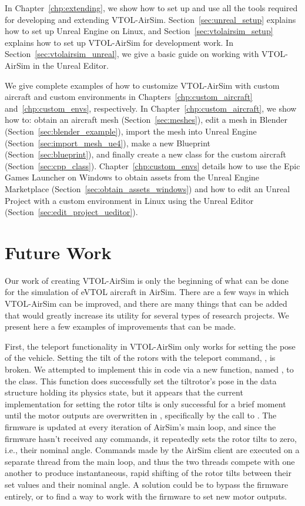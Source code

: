 In Chapter~\ref{chp:extending}, we show how to set up and use all the tools required for developing and extending VTOL-AirSim. Section~\ref{sec:unreal_setup} explains how to set up Unreal Engine on Linux, and Section~\ref{sec:vtolairsim_setup} explains how to set up VTOL-AirSim for development work. In Section~\ref{sec:vtolairsim_unreal}, we give a basic guide on working with VTOL-AirSim in the Unreal Editor.

We give complete examples of how to customize VTOL-AirSim with custom aircraft and custom environments in Chapters~\ref{chp:custom_aircraft} and~\ref{chp:custom_envs}, respectively. In Chapter~\ref{chp:custom_aircraft}, we show how to: obtain an aircraft mesh (Section~\ref{sec:meshes}), edit a mesh in Blender (Section~\ref{sec:blender_example}), import the mesh into Unreal Engine (Section~\ref{sec:import_mesh_ue4}), make a new Blueprint (Section~\ref{sec:blueprint}), and finally create a new \CC class for the custom aircraft (Section~\ref{sec:cpp_class}). Chapter~\ref{chp:custom_envs} details how to use the Epic Games Launcher on Windows to obtain assets from the Unreal Engine Marketplace (Section~\ref{sec:obtain_assets_windows}) and how to edit an Unreal Project with a custom environment in Linux using the Unreal Editor (Section~\ref{sec:edit_project_ueditor}).


\section{Future Work}
Our work of creating VTOL-AirSim is only the beginning of what can be done for the simulation of eVTOL aircraft in AirSim. There are a few ways in which VTOL-AirSim can be improved, and there are many things that can be added that would greatly increase its utility for several types of research projects. We present here a few examples of improvements that can be made.

First, the teleport functionality in VTOL-AirSim only works for setting the pose of the vehicle. Setting the tilt of the rotors with the teleport command, , is broken. We attempted to implement this in code via a new function, named , to the  \CC class. This function does successfully set the tiltrotor's pose in the data structure holding its physics state, but it appears that the current implementation for setting the rotor tilts is only successful for a brief moment until the motor outputs are overwritten in , specifically by the call to . The firmware is updated at every iteration of AirSim's main loop, and since the firmware hasn't received any commands, it repeatedly sets the rotor tilts to zero, i.e., their nominal angle. Commands made by the AirSim client are executed on a separate thread from the main loop, and thus the two threads compete with one another to produce instantaneous, rapid shifting of the rotor tilts between their set values and their nominal angle. A solution could be to bypass the  firmware entirely, or to find a way to work with the firmware to set new motor outputs.

